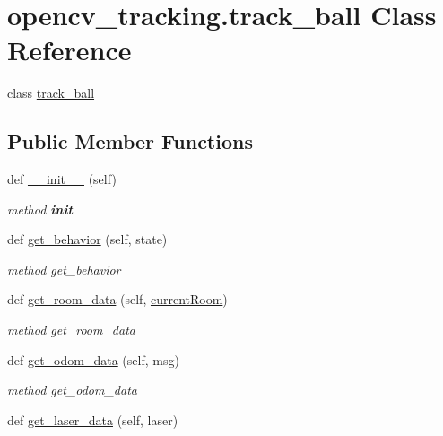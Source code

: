 \hypertarget{classopencv__tracking_1_1track__ball}{}\section{opencv\+\_\+tracking.\+track\+\_\+ball Class Reference}
\label{classopencv__tracking_1_1track__ball}


class \hyperlink{classopencv__tracking_1_1track__ball}{track\+\_\+ball}  


\subsection*{Public Member Functions}
\begin{DoxyCompactItemize}
\item 
def \hyperlink{classopencv__tracking_1_1track__ball_aab7d9901f59d6877955a8d9fbeb1dc0e}{\+\_\+\+\_\+init\+\_\+\+\_\+} (self)
\begin{DoxyCompactList}\small\item\em method {\bfseries init} \end{DoxyCompactList}\item 
def \hyperlink{classopencv__tracking_1_1track__ball_a3f89b28f29c4855aaf8bef0df281c2ef}{get\+\_\+behavior} (self, state)
\begin{DoxyCompactList}\small\item\em method get\+\_\+behavior \end{DoxyCompactList}\item 
def \hyperlink{classopencv__tracking_1_1track__ball_abfde0413e3ed7c7b1c79800e5df78f31}{get\+\_\+room\+\_\+data} (self, \hyperlink{classopencv__tracking_1_1track__ball_a6da54ed7cc2308ea868656753da993ed}{current\+Room})
\begin{DoxyCompactList}\small\item\em method get\+\_\+room\+\_\+data \end{DoxyCompactList}\item 
def \hyperlink{classopencv__tracking_1_1track__ball_ab4cb97ae895654b7e858c102945a20fd}{get\+\_\+odom\+\_\+data} (self, msg)
\begin{DoxyCompactList}\small\item\em method get\+\_\+odom\+\_\+data \end{DoxyCompactList}\item 
def \hyperlink{classopencv__tracking_1_1track__ball_af6054bbfa97909eb6e2ddc115954b6a0}{get\+\_\+laser\+\_\+data} (self, laser)

\end{DoxyCompactItemize}
